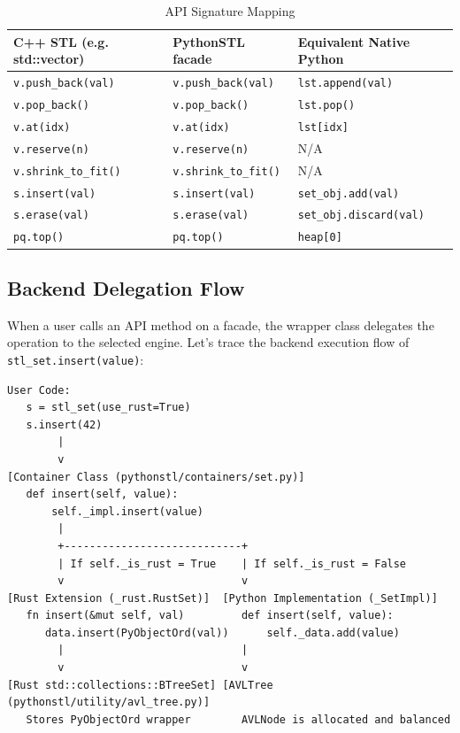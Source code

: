 \documentclass[11pt,a4paper]{article}
\begin{document}
\begin{table}[h!]
\centering
\begin{tabular}{@{}lll@{}}
\toprule
\textbf{C++ STL (e.g. std::vector)} & \textbf{PythonSTL facade} & \textbf{Equivalent Native Python} \\ \midrule
\texttt{v.push\_back(val)} & \texttt{v.push\_back(val)} & \texttt{lst.append(val)} \\
\texttt{v.pop\_back()} & \texttt{v.pop\_back()} & \texttt{lst.pop()} \\
\texttt{v.at(idx)} & \texttt{v.at(idx)} & \texttt{lst[idx]} \\
\texttt{v.reserve(n)} & \texttt{v.reserve(n)} & N/A \\
\texttt{v.shrink\_to\_fit()} & \texttt{v.shrink\_to\_fit()} & N/A \\
\texttt{s.insert(val)} & \texttt{s.insert(val)} & \texttt{set\_obj.add(val)} \\
\texttt{s.erase(val)} & \texttt{s.erase(val)} & \texttt{set\_obj.discard(val)} \\
\texttt{pq.top()} & \texttt{pq.top()} & \texttt{heap[0]} \\ \bottomrule
\end{tabular}
\caption{API Signature Mapping}
\end{table}

\subsection{Backend Delegation Flow}
When a user calls an API method on a facade, the wrapper class delegates the operation to the selected engine. Let's trace the backend execution flow of \texttt{stl\_set.insert(value)}:

\begin{verbatim}
User Code:
   s = stl_set(use_rust=True)
   s.insert(42)
        |
        v
[Container Class (pythonstl/containers/set.py)]
   def insert(self, value):
       self._impl.insert(value)
        |
        +----------------------------+
        | If self._is_rust = True    | If self._is_rust = False
        v                            v
[Rust Extension (_rust.RustSet)]  [Python Implementation (_SetImpl)]
   fn insert(&mut self, val)         def insert(self, value):
      data.insert(PyObjectOrd(val))      self._data.add(value)
        |                            |
        v                            v
[Rust std::collections::BTreeSet] [AVLTree (pythonstl/utility/avl_tree.py)]
   Stores PyObjectOrd wrapper        AVLNode is allocated and balanced
\end{verbatim}
\end{document}
